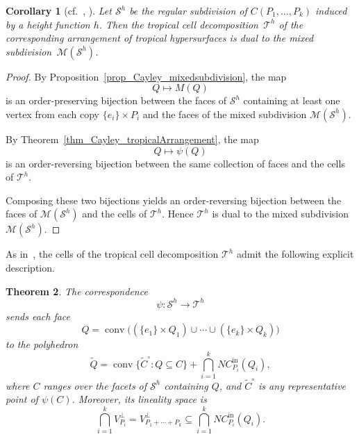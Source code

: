 \documentclass[12pt, reqno]{amsart}
\theoremstyle{plain}
\newtheorem{theorem}{Theorem}[section]
\newtheorem{corollary}[theorem]{Corollary}
\theoremstyle{definition}
\numberwithin{equation}{section}
\begin{document}
\begin{corollary}[{cf.\ \cite[Corollary 4.9]{joswig_essentials_tropical_2021}, \cite[Theorem 5.3]{d2023realizing}}]
\label{cor_tropicalCayleyMixedSubdivision}
Let $\mathcal{S}^h$ be the regular subdivision of $C(P_1,\ldots,P_k)$ induced by a height function $h$. Then the tropical cell decomposition~$\mathscr{T}^h$ of the corresponding arrangement of tropical hypersurfaces is dual to the mixed subdivision~$\mathcal{M}(\mathcal{S}^h)$.
\end{corollary}

\begin{proof}
By Proposition~\ref{prop_Cayley_mixedsubdivision}, the map
\[
Q\longmapsto M(Q)
\]
is an order-preserving bijection between the faces of $\mathcal{S}^h$ containing at least one vertex from each copy $\{e_i\}\times P_i$ and the faces of the mixed subdivision $\mathcal{M}(\mathcal{S}^h)$.

By Theorem~\ref{thm_Cayley_tropicalArrangement}, the map
\[
Q\longmapsto\psi(Q)
\]
is an order-reversing bijection between the same collection of faces and the cells of $\mathscr{T}^h$.

Composing these two bijections yields an order-reversing bijection between the faces of $\mathcal{M}(\mathcal{S}^h)$ and the cells of $\mathscr{T}^h$. Hence $\mathscr{T}^h$ is dual to the mixed subdivision $\mathcal{M}(\mathcal{S}^h)$.
\end{proof}


As in~, the cells of the tropical cell decomposition $\mathscr{T}^h$ admit the following explicit description.

\begin{theorem}\label{thm_trop_cells_arrangement}
The correspondence
\[
\psi:\mathcal{S}^h\longrightarrow\mathscr{T}^h
\]
sends each face
\[
Q=
\operatorname{conv}\bigl((\{e_1\}\times Q_1)\cup\cdots\cup(\{e_k\}\times Q_k)\bigr)
\]
to the polyhedron
\[
\widetilde{Q}
=
\operatorname{conv}\{\widetilde{C}^\circ:Q\subseteq C\}
+
\bigcap_{i=1}^k NC_{P_i}^{\mathrm{in}}(Q_i),
\]
where $C$ ranges over the facets of $\mathcal{S}^h$ containing $Q$, and $\widetilde{C}^\circ$ is any representative point of $\psi(C)$. Moreover, its lineality space is
\[
\bigcap_{i=1}^k V_{P_i}^{\perp}= V_{P_1+\cdots+P_k}^\perp
\subseteq
\bigcap_{i=1}^k NC_{P_i}^{\mathrm{in}}(Q_i).
\]
\end{theorem}
\end{document}
